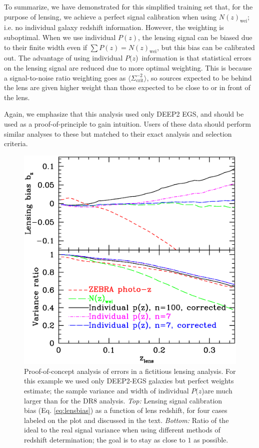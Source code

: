 \documentclass[preprint]{aastex}
\newcommand{\pofz}{$P(z$)}
\begin{document}
To summarize, we have demonstrated for this simplified training set that, for
the purpose of lensing, we achieve a perfect signal calibration when using
$N(z)_\mathrm{wei}$; i.e. no individual galaxy redshift information.  However,
the weighting is suboptimal.  When we use individual $P(z)$, the lensing signal
can be biased due to their finite width even if $\sum P(z) =
N(z)_\mathrm{wei}$, but this bias can be calibrated out.  The advantage of
using individual \pofz\ information is that statistical errors on the lensing
signal are reduced due to more optimal weighting.  This is because a
signal-to-noise ratio weighting goes as $\langle \Sigma_{\mathrm{crit}}^{-2}
\rangle$, so sources expected to be behind the lens are given higher weight
than those expected to be close to or in front of the lens.

Again, we emphasize that this analysis used only DEEP2 EGS, and should be used
as a proof-of-principle to gain intuition.  Users of these data should perform
similar analyses to these but matched to their exact analysis and selection
criteria.

\begin{figure} [h]\centering
    \includegraphics[scale=0.5]{figures/pz.egs.c3n7.paper.ps}

    \caption{ Proof-of-concept analysis of errors in a fictitious lensing
    analysis.  For this example we used only DEEP2-EGS galaxies but perfect
    weights estimate; the sample variance and width of individual \pofz are
    much larger than for the DR8 analysis.  {\em Top:} Lensing signal
    calibration bias (Eq.  \ref{eq:lensbias}) as a function of lens redshift,
    for four  cases labeled on the plot and discussed in the text.  {\em
    Bottom:}  Ratio of the ideal to the real signal variance when using
    different  methods of redshift determination; the goal is to stay as close
    to $1$  as possible. \label{fig:simplebias}}

\end{figure}
\end{document}
